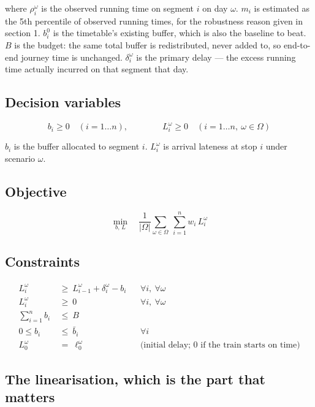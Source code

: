 \documentclass[11pt,a4paper]{article}
\begin{document}
\noindent where $\rho_i^\omega$ is the observed running time on segment $i$ on day $\omega$.
$m_i$ is estimated as the 5th percentile of observed running times, for the robustness
reason given in section 1. $b_i^0$ is the timetable's existing buffer, which is also the
baseline to beat. $B$ is the budget: the same total buffer is redistributed, never added to,
so end-to-end journey time is unchanged. $\delta_i^\omega$ is the primary delay --- the
excess running time actually incurred on that segment that day.

\subsection*{Decision variables}

\[
b_i \ge 0 \quad (i = 1 \dots n), \qquad\qquad L_i^\omega \ge 0 \quad (i = 1 \dots n,\ \omega \in \Omega)
\]

$b_i$ is the buffer allocated to segment $i$. $L_i^\omega$ is arrival lateness at stop $i$
under scenario $\omega$.

\subsection*{Objective}

\[
\min_{b,\,L}\quad \frac{1}{|\Omega|}\sum_{\omega \in \Omega}\ \sum_{i=1}^{n} w_i\, L_i^\omega
\]

\subsection*{Constraints}

\[
\begin{aligned}
L_i^\omega &\ \ge\ L_{i-1}^\omega + \delta_i^\omega - b_i && \forall i,\ \forall \omega \\
L_i^\omega &\ \ge\ 0 && \forall i,\ \forall \omega \\
\textstyle\sum_{i=1}^{n} b_i &\ \le\ B \\
0 \le b_i &\ \le\ \bar b_i && \forall i \\
L_0^\omega &\ =\ \ell_0^\omega && \text{(initial delay; } 0 \text{ if the train starts on time)}
\end{aligned}
\]

\subsection*{The linearisation, which is the part that matters}
\end{document}
